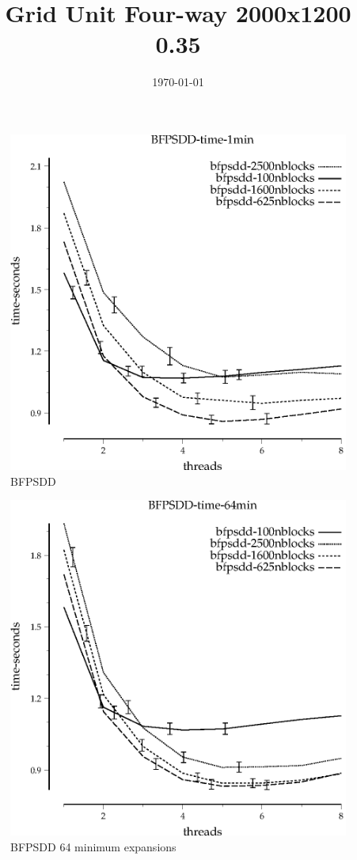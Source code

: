 \documentclass{article}
\title{Grid Unit Four-way 2000x1200 0.35}
\date{\today}
\begin{document}
\maketitle

\begin{figure}
\begin{center}
\includegraphics{BFPSDD-time-1min}
\end{center}
\caption{BFPSDD}
\end{figure}

\begin{figure}
\begin{center}
\includegraphics{BFPSDD-time-64min}
\end{center}
\caption{BFPSDD 64 minimum expansions}
\end{figure}
\end{document}
